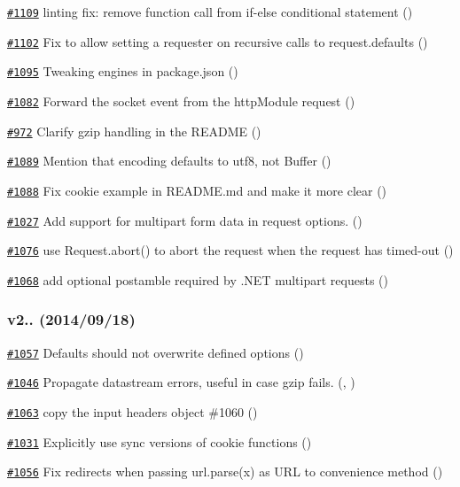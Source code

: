 \begin{DoxyItemize}
\item \href{https://github.com/request/request/pull/1109}{\tt \#1109} linting fix\+: remove function call from if-\/else conditional statement ()
\item \href{https://github.com/request/request/pull/1102}{\tt \#1102} Fix to allow setting a {\ttfamily requester} on recursive calls to {\ttfamily request.\+defaults} ()
\item \href{https://github.com/request/request/pull/1095}{\tt \#1095} Tweaking engines in package.\+json ()
\item \href{https://github.com/request/request/pull/1082}{\tt \#1082} Forward the socket event from the http\+Module request ()
\item \href{https://github.com/request/request/pull/972}{\tt \#972} Clarify gzip handling in the R\+E\+A\+D\+ME ()
\item \href{https://github.com/request/request/pull/1089}{\tt \#1089} Mention that encoding defaults to utf8, not Buffer ()
\item \href{https://github.com/request/request/pull/1088}{\tt \#1088} Fix cookie example in R\+E\+A\+D\+M\+E.\+md and make it more clear ()
\item \href{https://github.com/request/request/pull/1027}{\tt \#1027} Add support for multipart form data in request options. ()
\item \href{https://github.com/request/request/pull/1076}{\tt \#1076} use Request.\+abort() to abort the request when the request has timed-\/out ()
\item \href{https://github.com/request/request/pull/1068}{\tt \#1068} add optional postamble required by .N\+ET multipart requests ()
\end{DoxyItemize}

\subsubsection*{v2.. (2014/09/18)}


\begin{DoxyItemize}
\item \href{https://github.com/request/request/pull/1057}{\tt \#1057} Defaults should not overwrite defined options ()
\item \href{https://github.com/request/request/pull/1046}{\tt \#1046} Propagate datastream errors, useful in case gzip fails. (, )
\item \href{https://github.com/request/request/pull/1063}{\tt \#1063} copy the input headers object \#1060 ()
\item \href{https://github.com/request/request/pull/1031}{\tt \#1031} Explicitly use sync versions of cookie functions ()
\item \href{https://github.com/request/request/pull/1056}{\tt \#1056} Fix redirects when passing url.\+parse(x) as U\+RL to convenience method ()
\end{DoxyItemize}

